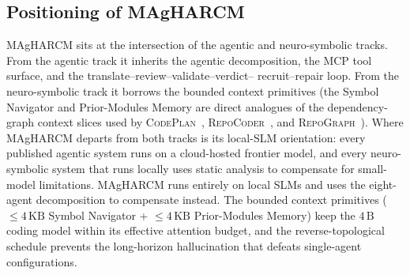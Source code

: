 \subsection{Positioning of MAgHARCM}

MAgHARCM sits at the intersection of the agentic and neuro-symbolic
tracks. From the agentic track it inherits the agentic decomposition,
the MCP tool surface, and the translate--review--validate--verdict--
recruit--repair loop. From the neuro-symbolic track it borrows the
bounded context primitives (the Symbol Navigator and Prior-Modules
Memory are direct analogues
of the dependency-graph context slices used by
\textsc{CodePlan}~\cite{p03_codeplan},
\textsc{RepoCoder}~\cite{p61_repocoder}, and
\textsc{RepoGraph}~\cite{p62_repograph}). Where MAgHARCM departs from
both tracks is its local-SLM orientation: every published agentic
system runs on a cloud-hosted frontier model, and every
neuro-symbolic system that runs locally uses static analysis to
compensate for small-model limitations. MAgHARCM runs entirely on
local SLMs and uses the eight-agent decomposition to compensate
instead. The bounded context primitives ($\le 4\,\text{KB}$ Symbol
Navigator + $\le 4\,\text{KB}$ Prior-Modules Memory) keep the
$4\,\text{B}$ coding model within its effective attention budget, and
the reverse-topological schedule prevents the long-horizon
hallucination that defeats single-agent configurations.
